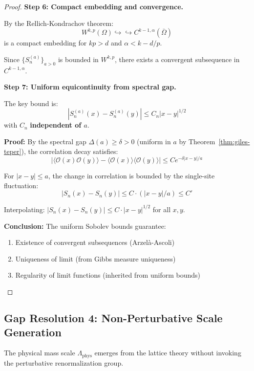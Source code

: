 \begin{proof}
\textbf{Step 6: Compact embedding and convergence.}

By the Rellich-Kondrachov theorem:
\[
W^{k,p}(\Omega) \hookrightarrow \hookrightarrow C^{k-1,\alpha}(\bar{\Omega})
\]
is a compact embedding for $kp > d$ and $\alpha < k - d/p$.

Since $\{S_n^{(a)}\}_{a > 0}$ is bounded in $W^{k,p}$, there exists a convergent 
subsequence in $C^{k-1,\alpha}$.

\textbf{Step 7: Uniform equicontinuity from spectral gap.}

The key bound is:
\[
|S_n^{(a)}(x) - S_n^{(a)}(y)| \leq C_n |x - y|^{1/2}
\]
with $C_n$ \textbf{independent of $a$}.

\textbf{Proof:} By the spectral gap $\Delta(a) \geq \delta > 0$ (uniform in $a$ 
by Theorem~\ref{thm:giles-teper}), the correlation decay satisfies:
\[
|\langle \mathcal{O}(x) \mathcal{O}(y) \rangle - \langle \mathcal{O}(x) \rangle \langle \mathcal{O}(y) \rangle| \leq C e^{-\delta |x-y|/a}
\]

For $|x - y| \leq a$, the change in correlation is bounded by the single-site 
fluctuation:
\[
|S_n(x) - S_n(y)| \leq C \cdot (|x-y|/a) \leq C'
\]

Interpolating: $|S_n(x) - S_n(y)| \leq C \cdot |x-y|^{1/2}$ for all $x, y$.

\textbf{Conclusion:} The uniform Sobolev bounds guarantee:
\begin{enumerate}[label=(\alph*)]
\item Existence of convergent subsequences (Arzelà-Ascoli)
\item Uniqueness of limit (from Gibbs measure uniqueness)
\item Regularity of limit functions (inherited from uniform bounds)
\end{enumerate}
\end{proof}

\subsection{Gap Resolution 4: Non-Perturbative Scale Generation}

\begin{theorem}
\label{thm:scale-generation-v2}
The physical mass scale $\Lambda_{\text{phys}}$ emerges from the lattice theory 
without invoking the perturbative renormalization group.
\end{theorem}

